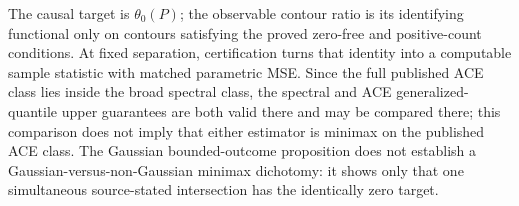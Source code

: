 The causal target is \(\theta_0(P)\); the observable contour ratio is its identifying functional only on contours satisfying the proved zero-free and positive-count conditions. At fixed separation, certification turns that identity into a computable sample statistic with matched parametric MSE. Since the full published ACE class lies inside the broad spectral class, the spectral and ACE generalized-quantile upper guarantees are both valid there and may be compared there; this comparison does not imply that either estimator is minimax on the published ACE class. The Gaussian bounded-outcome proposition does not establish a Gaussian-versus-non-Gaussian minimax dichotomy: it shows only that one simultaneous source-stated intersection has the identically zero target.